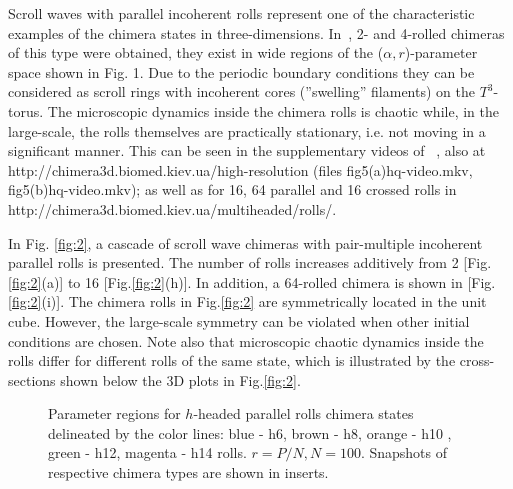 \documentclass[epjST]{svjour}
\begin{document}
\hspace*{0.5cm} Scroll waves with parallel incoherent rolls represent one of the characteristic examples of the chimera states in three-dimensions. In~\cite{msom2015}, 2- and 4-rolled chimeras of this type were obtained, they exist in wide regions of the ($\alpha,r$)-parameter space shown in Fig. 1.  Due to the periodic boundary conditions they can be considered as scroll rings with incoherent cores (''swelling'' filaments) on the $T^3$-torus.  The microscopic dynamics inside the chimera rolls is chaotic while, in the large-scale, the rolls themselves are practically stationary, i.e. not moving  in a significant manner. This can be seen in the supplementary videos of ~\cite{msom2015},  also at http://chimera3d.biomed.kiev.ua/high-resolution (files fig5(a)hq-video.mkv, fig5(b)hq-video.mkv); as well as for 16, 64 parallel and 16 crossed rolls 
 in http://chimera3d.biomed.kiev.ua/multiheaded/rolls/.


In Fig. \ref{fig:2}, a cascade of  scroll wave chimeras with pair-multiple incoherent parallel  rolls is presented. The number of rolls  increases additively from 2 [Fig.\ref{fig:2}(a)] to 
16 [Fig.\ref{fig:2}(h)].  In addition, a 64-rolled chimera is shown in [Fig.\ref{fig:2}(i)].  The chimera rolls in Fig.\ref{fig:2} are symmetrically located in the unit cube.  However, the large-scale symmetry can be violated when other initial conditions are chosen.  Note also that microscopic chaotic dynamics inside the rolls differ for different  rolls of the same state, which is  illustrated by the cross-sections shown below the 3D plots in Fig.\ref{fig:2}. 

 \begin{figure}[ht!]
\caption {Parameter regions for $h$-headed parallel rolls chimera states delineated by the color lines: 
blue - h6, brown - h8, orange - h10 , green - h12, magenta - h14 rolls. 
 $r=P/N, N=100$. Snapshots of respective chimera types are shown in inserts.}
  \label{fig:3}
\end{figure}
\end{document}
